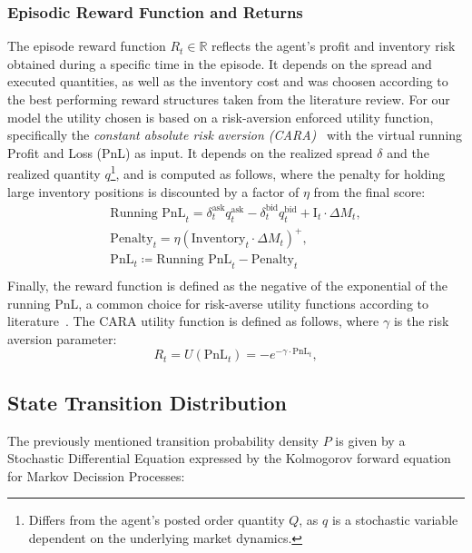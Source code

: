 \subsubsection{Episodic Reward Function and Returns}

The episode reward function $R_t \in \mathbb{R}$ reflects the agent's profit and inventory risk obtained during a specific time in the episode.
It depends on the spread and executed quantities, as well as the inventory cost and was choosen according to the best performing reward structures taken from the literature review.
For our model the utility chosen is based on a risk-aversion enforced utility function, specifically the \textit{constant absolute risk aversion (CARA)}~\cite{Arrow1965, Pratt1964}
with the virtual running Profit and Loss (PnL) as input.
It depends on the realized spread $\delta$ and the realized quantity $q$\footnote{Differs from the agent's posted order quantity $Q$, as $q$ is a stochastic variable dependent on the underlying market dynamics.},
and is computed as follows, where the penalty for holding large inventory positions is discounted by a factor of \( \eta \) from the final score:
\begin{gather*}
    \text{Running PnL}_t = \delta_t^{\text{ask}} q_t^{\text{ask}} - \delta_t^{\text{bid}} q_t^{\text{bid}} + \text{I}_t \cdot \Delta M_t, \\
    \text{Penalty}_t = \eta \left( \text{Inventory}_t \cdot \Delta M_t \right)^+,\\
    \text{PnL}_t \coloneqq \text{Running PnL}_t - \text{Penalty}_t\\
\end{gather*}
Finally, the reward function is defined as the negative of the exponential of the running PnL, a common choice for risk-averse utility functions according to literature~\cite{Gueant2022, Selser2021a, FalcesMarin2022}.
The CARA utility function is defined as follows, where \( \gamma \) is the risk aversion parameter:
\[
    R_t = U(\text{PnL}_t) = -e^{-\gamma \cdot \text{PnL}_t},
\]

\subsection{State Transition Distribution}
\label{subsec:state-transition-distribution}

The previously mentioned transition probability density $P$ is given by a Stochastic Differential Equation expressed by the Kolmogorov
forward equation for Markov Decission Processes:

